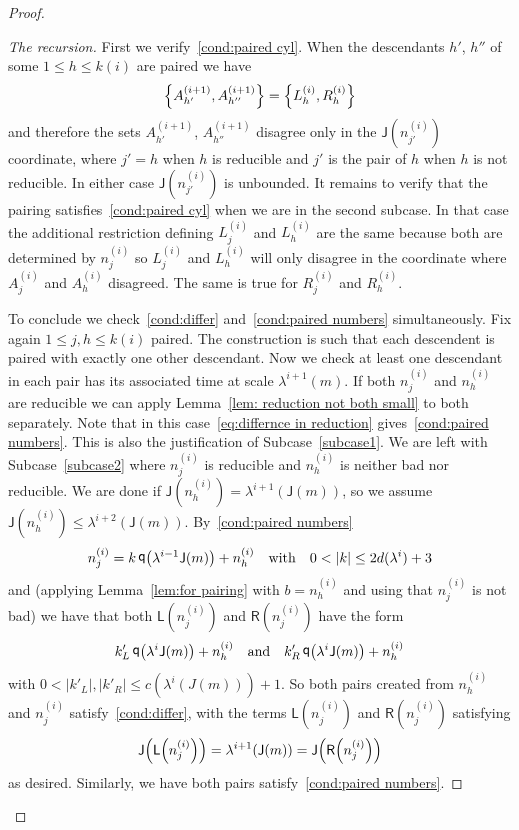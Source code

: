 \documentclass[10pt]{amsart}
\theoremstyle{definition}\newtheorem{defi}[theo]{Definition}\newtheorem{rema}[theo]{Remark}\newtheorem{exam}[theo]{Example}\newtheorem{exem}[theo]{Example}\newtheorem{nota}[theo]{Notation}
\DeclareMathOperator{\q}{\mathsf{q}}
\newcommand{\lft}{\mathsf{L}}
\newcommand{\rht}{\mathsf{R}}
\newcommand{\scl}{\mathsf{J}}
\let\originalleft\left
\let\originalright\right
\renewcommand{\left}{\mathopen{}\mathclose\bgroup\originalleft}
\renewcommand{\right}{\aftergroup\egroup\originalright}
\begin{document}
\begin{proof}
\begin{proof}[{The recursion}]
First we verify~\eqref{cond:paired cyl}. When the descendants $h'$, $h''$ of some $1 \le h \le k(i)$ are paired we have
\[
\left\{ A^{(i+1)}_{h'}, A^{(i+1)}_{h''} \right\} = \left\{ L^{(i)}_h, R^{(i)}_h \right\}
\]
and therefore the sets $A^{(i+1)}_{h'}$, $A^{(i+1)}_{h''}$ disagree only in the $\scl(n^{(i)}_{j'})$ coordinate, where $j' = h$ when $h$ is reducible and $j'$ is the pair of $h$ when $h$ is not reducible. In either case $\scl(n^{(i)}_{j'})$ is unbounded. It remains to verify that the pairing satisfies~\eqref{cond:paired cyl} when we are in the second subcase. In that case the additional restriction defining $L^{(i)}_j$ and $L^{(i)}_h$ are the same because both are determined by $n^{(i)}_j$ so $L^{(i)}_j$ and $L^{(i)}_h$ will only disagree in the coordinate where $A^{(i)}_j$ and $A^{(i)}_h$ disagreed. The same is true for $R^{(i)}_j$ and $R^{(i)}_h$.


To conclude we check~\eqref{cond:differ} and~\eqref{cond:paired numbers} simultaneously. Fix again $1 \le j,h \le k(i)$ paired. The construction is such that each descendent is paired with exactly one other descendant. Now we check at least one descendant in each pair has its associated time at scale $\lambda^{i+1}(m)$. If both $n_j^{(i)}$ and $n_h^{(i)}$ are reducible we can apply Lemma~\ref{lem: reduction not both small} to both separately. Note that in this case~\eqref{eq:differnce in reduction} gives~\eqref{cond:paired numbers}. This is also the justification of Subcase~\eqref{subcase1}. We are left with Subcase~\eqref{subcase2} where $n_j^{(i)}$ is reducible and $n_h^{(i)}$ is neither bad nor reducible. We are done if $\scl(n_h^{(i)}) = \lambda^{i+1}(\scl(m))$, so we assume $\scl(n_h^{(i)}) \le \lambda^{i+2}(\scl(m))$. By~\eqref{cond:paired numbers}
\[
n_j^{(i)}=k \q\left(\lambda^{i-1}\scl(m)\right)+n_h^{(i)} \quad\text{with}\quad 0<|k|\leq 2d(\lambda^{i})+3
\]
and (applying Lemma~\ref{lem:for pairing} with $b = n^{(i)}_h$ and using that $n^{(i)}_j$ is not bad) we have that both $\lft(n_j^{(i)})$ and $\rht(n_j^{(i)})$ have the form
\[
k'_L \q\left(\lambda^i \scl(m)\right) + n_h^{(i)} \quad\text{and}\quad k'_R \q\left(\lambda^i \scl(m)\right) + n_h^{(i)}
\]
with $0<|k'_L|,|k'_R|\leq c(\lambda^i(J(m))) + 1$. So both pairs created from $n_h^{(i)}$ and $n_j^{(i)}$ satisfy~\eqref{cond:differ}, with the terms $\lft(n_j^{(i)})$ and $\rht(n_j^{(i)})$ satisfying
\[
\scl\left(\lft\left(n_j^{(i)}\right)\right) = \lambda^{i+1}\left(\scl(m)\right) = \scl\left(\rht\left(n_j^{(i)}\right)\right)
\]
as desired. Similarly, we have both pairs satisfy~\eqref{cond:paired numbers}.
\end{proof}
\let\qed\relax
\end{proof}
\end{document}
